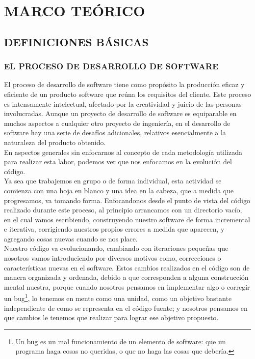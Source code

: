 

%

\chapter{MARCO TEÓRICO}
\section{DEFINICIONES BÁSICAS}
\subsection{EL PROCESO DE DESARROLLO DE SOFTWARE}

El proceso de desarrollo de software tiene como propósito la producción eficaz y eficiente de un producto software que reúna los requisitos del cliente. Este proceso es intensamente intelectual, afectado por la creatividad y juicio de las personas involucradas. Aunque un proyecto de desarrollo de software es equiparable en muchos aspectos a cualquier otro proyecto de ingeniería, en el desarrollo de software hay una serie de desafíos adicionales, relativos esencialmente a la naturaleza del producto obtenido. \\

En aspectos generales sin enfocarnos al concepto de cada metodología utilizada para realizar esta labor, podemos ver que nos enfocamos en la evolución del código.\\

Ya sea que trabajemos en grupo o de forma individual, esta actividad se comienza con una hoja en blanco y una idea en la cabeza, que a medida que progresamos, va tomando forma.
Enfocandonos desde el punto de vista del código realizado durante este proceso, al principio arrancamos con un directorio vacío, en el cual vamos escribiendo, construyendo nuestro software
de forma incremental e iterativa, corrigiendo nuestros propios errores a medida que aparecen, y agregando cosas nuevas cuando se nos place.\\

Nuestro código va evolucionando, cambiando con iteraciones pequeñas que nosotros vamos introduciendo por diversos motivos como, correcciones o características nuevas en el software.
Estos cambios realizados en el código son de manera organizada y ordenada, debido a que corresponden a alguna construcción mental nuestra, porque cuando nosotros pensamos en implementar algo o corregir un bug\footnote{Un bug es un mal funcionamiento de un elemento de software: que un programa haga cosas no queridas, o que no haga las cosas que debería.}, lo tenemos en mente como una unidad, como un objetivo bastante independiente de como se representa en el código fuente; y nosotros pensamos en que cambios le tenemos que realizar para lograr ese objetivo propuesto.

